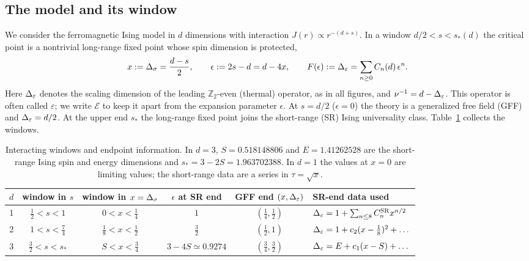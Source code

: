 \subsection{The model and its window}
We consider the ferromagnetic Ising model in $d$ dimensions with interaction
$J(r)\propto r^{-(d+s)}$. In a window $d/2<s<s_*(d)$ the critical point is a
nontrivial long-range fixed point whose spin dimension is protected,
\begin{equation}
 x:=\Delta_\sigma=\frac{d-s}{2},\qquad
 \epsilon:=2s-d=d-4x,\qquad
 F(\epsilon):=\Delta_\varepsilon=\sum_{n\ge0}C_n(d)\,\epsilon^n .
 \label{rs:eq:conventions}
\end{equation}
Here $\Delta_\varepsilon$ denotes the scaling dimension of the leading $\mathbb Z_2$-even (thermal)
operator, as in all figures, and $\nu^{-1}=d-\Delta_\varepsilon$. This operator is often called
$\varepsilon$; we write $\mathcal E$ to keep it apart from the expansion parameter $\epsilon$.
At $s=d/2$ ($\epsilon=0$) the theory
is a generalized free field (GFF) and $\Delta_\varepsilon=d/2$. At the upper end $s_*$ the long-range
fixed point joins the short-range (SR) Ising universality class. Table~\ref{rs:tab:windows}
collects the windows.

\begin{table}[htbp]\centering\small\setlength{\tabcolsep}{4pt}
\begin{tabular}{@{}c c c c c l@{}}
\toprule
$d$ & window in $s$ & window in $x=\Delta_\sigma$ & $\epsilon$ at SR end & GFF end $(x,\Delta_\varepsilon)$ & SR-end data used\\ \midrule
1 & $\tfrac12<s<1$ & $0<x<\tfrac14$ & $1$ & $(\tfrac14,\tfrac12)$ & $\Delta_\varepsilon=1+\sum_{n\le8}C^{\mathrm{SR}}_n x^{n/2}$\\
2 & $1<s<\tfrac74$ & $\tfrac18<x<\tfrac12$ & $\tfrac32$ & $(\tfrac12,1)$ & $\Delta_\varepsilon=1+c_2(x-\tfrac18)^2+\dots$\\
3 & $\tfrac32<s<s_*$ & $S<x<\tfrac34$ & $3-4S\simeq0.9274$ & $(\tfrac34,\tfrac32)$ & $\Delta_\varepsilon=E+c_1(x-S)+\dots$\\
\bottomrule
\end{tabular}
\caption{Interacting windows and endpoint information. In $d=3$,
$S=0.518148806$ and $E=1.41262528$ are the short-range Ising spin and energy
dimensions and $s_*=3-2S=1.963702388$. In $d=1$ the values at $x=0$ are limiting
values; the short-range data are a series in $\tau=\sqrt x$.}
\label{rs:tab:windows}
\end{table}

